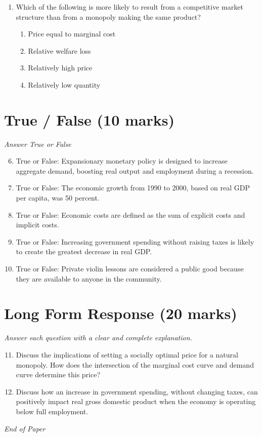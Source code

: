 \documentclass[12pt]{article}
\begin{document}
\begin{enumerate}[label=\arabic*.]
\begin{enumerate}[label=(\alph*)]
    \item The euro and other foreign currencies held by the Federal Reserve
    \item Gold bars in secure locations like Fort Knox
    \item The promise of the U.S. government to maintain its value
    \item The value of the actual paper on which it is printed.
\end{enumerate}
\item Which of the following is more likely to result from a competitive market structure than from a monopoly making the same product?
\begin{enumerate}[label=(\alph*)]
    \item Price equal to marginal cost
    \item Relative welfare loss
    \item Relatively high price
    \item Relatively low quantity
\end{enumerate}
\end{enumerate}

\section*{True / False (10 marks)}
\textit{Answer True or False}
\begin{enumerate}[label=\arabic*.]
\setcounter{enumi}{5}
\item True or False: Expansionary monetary policy is designed to increase aggregate demand, boosting real output and employment during a recession.
\item True or False: The economic growth from 1990 to 2000, based on real GDP per capita, was 50 percent.
\item True or False: Economic costs are defined as the sum of explicit costs and implicit costs.
\item True or False: Increasing government spending without raising taxes is likely to create the greatest decrease in real GDP.
\item True or False: Private violin lessons are considered a public good because they are available to anyone in the community.
\end{enumerate}

\section*{Long Form Response (20 marks)}
\textit{Answer each question with a clear and complete explanation.}
\begin{enumerate}[label=\arabic*.]
\setcounter{enumi}{10}
\item Discuss the implications of setting a socially optimal price for a natural monopoly. How does the intersection of the marginal cost curve and demand curve determine this price?
\item Discuss how an increase in government spending, without changing taxes, can positively impact real gross domestic product when the economy is operating below full employment.
\end{enumerate}

\vfill
\noindent\textit{End of Paper}
\end{document}
